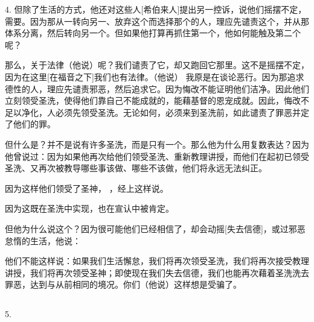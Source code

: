 4. 但除了生活的方式，他还对这些人[希伯来人]提出另一控诉，说他们摇摆不定，需要。因为那从一转向另一、放弃这个而选择那个的人，理应先谴责这个，并从那体系分离，然后转向另一个。但如果他打算再抓住第一个，他如何能触及第二个呢？\par

那么，关于法律（他说）呢？我们谴责了它，却又跑回它那里。这不是摇摆不定，因为在这里[在福音之下]我们也有法律。（他说）  我原是在谈论恶行。因为那追求德性的人，理应先谴责邪恶，然后追求它。因为悔改不能证明他们洁净。因此他们立刻领受圣洗，使得他们靠自己不能成就的，能藉基督的恩宠成就。因此，悔改不足以净化，人必须先领受圣洗。无论如何，必须来到圣洗前，如此谴责了罪恶并定了他们的罪。\par

但什么是？并不是说有许多圣洗，而是只有一个。那么他为什么用复数表达？因为他曾说过：因为如果他再次给他们领受圣洗、重新教理讲授，而他们在起初已领受圣洗、又再次被教导哪些事该做、哪些不该做，他们将永远无法纠正。\par

因为这样他们领受了圣神， ，经上这样说。\par

因为这既在圣洗中实现，也在宣认中被肯定。\par

但他为什么说这个？因为很可能他们已经相信了，却会动摇[失去信德]，或过邪恶怠惰的生活，他说：\par

他们不能这样说：如果我们生活懈怠，我们将再次领受圣洗，我们将再次接受教理讲授，我们将再次领受圣神；即使现在我们失去信德，我们也能再次藉着圣洗洗去罪恶，达到与从前相同的境况。你们（他说）这样想是受骗了。\par


\subsection{}

5. \par


